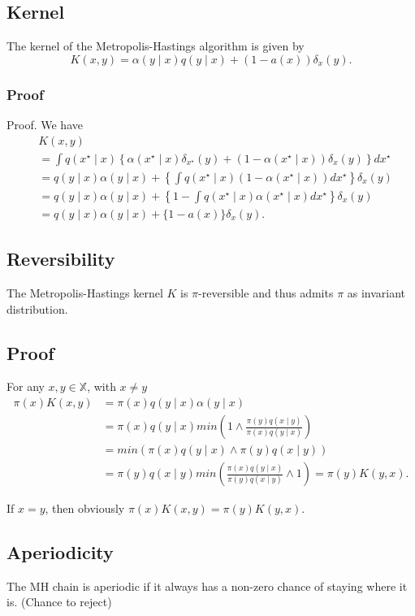\documentclass{article}
\begin{document}
\subsection{Kernel}
The kernel of the Metropolis-Hastings algorithm is given by
$$
K(x, y)=\alpha(y \mid x) q(y \mid x)+(1-a(x)) \delta_x(y) .
$$
\subsubsection{Proof}
Proof.
We have
$$
\begin{aligned}
& K(x, y) \\
& =\int q\left(x^{\star} \mid x\right)\left\{\alpha\left(x^{\star} \mid x\right) \delta_{x^{\star}}(y)+\left(1-\alpha\left(x^{\star} \mid x\right)\right) \delta_x(y)\right\} d x^{\star} \\
& =q(y \mid x) \alpha(y \mid x)+\left\{\int q\left(x^{\star} \mid x\right)\left(1-\alpha\left(x^{\star} \mid x\right)\right) d x^{\star}\right\} \delta_x(y) \\
& =q(y \mid x) \alpha(y \mid x)+\left\{1-\int q\left(x^{\star} \mid x\right) \alpha\left(x^{\star} \mid x\right) d x^{\star}\right\} \delta_x(y) \\
& =q(y \mid x) \alpha(y \mid x)+\{1-a(x)\} \delta_x(y) .
\end{aligned}
$$
\subsection{Reversibility}
The Metropolis-Hastings kernel $K$ is $\pi$-reversible and thus admits $\pi$ as invariant distribution.

\subsection{Proof}
For any $x, y \in \mathbb{X}$, with $x \neq y$
$$
\begin{aligned}
\pi(x) K(x, y) & =\pi(x) q(y \mid x) \alpha(y \mid x) \\
& =\pi(x) q(y \mid x)min\left(1 \wedge \frac{\pi(y) q(x \mid y)}{\pi(x) q(y \mid x)}\right) \\
& =min (\pi(x) q(y \mid x) \wedge \pi(y) q(x \mid y)) \\
& =\pi(y) q(x \mid y)min\left(\frac{\pi(x) q(y \mid x)}{\pi(y) q(x \mid y)} \wedge 1\right)=\pi(y) K(y, x) .
\end{aligned}
$$

If $x=y$, then obviously $\pi(x) K(x, y)=\pi(y) K(y, x)$.

\subsection{Aperiodicity}
The $\mathrm{MH}$ chain is aperiodic if it always has a non-zero chance of staying where it is. (Chance to reject)
\end{document}

